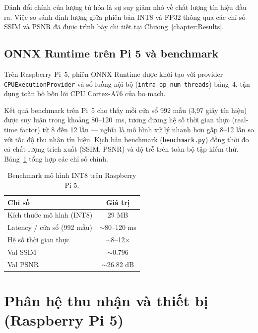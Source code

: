 \documentclass[../DoAn.tex]{subfiles}
\begin{document}
Đánh đổi chính của lượng tử hóa là sự suy giảm nhỏ về chất lượng tín hiệu đầu ra. Việc so sánh định lượng giữa phiên bản INT8 và FP32 thông qua các chỉ số SSIM và PSNR đã được trình bày chi tiết tại Chương~\ref{chapter:Results}.

\subsection{ONNX Runtime trên Pi 5 và benchmark}

Trên Raspberry Pi~5, phiên ONNX Runtime được khởi tạo với provider \texttt{CPUExecutionProvider} và số luồng nội bộ (\texttt{intra\_op\_num\_threads}) bằng~4, tận dụng toàn bộ bốn lõi CPU Cortex-A76 của bo mạch.

Kết quả benchmark trên Pi~5 cho thấy mỗi cửa sổ 992 mẫu (3{,}97 giây tín hiệu) được suy luận trong khoảng 80--120~ms, tương đương hệ số thời gian thực (real-time factor) từ 8 đến 12 lần --- nghĩa là mô hình xử lý nhanh hơn gấp 8--12 lần so với tốc độ thu nhận tín hiệu. Kịch bản benchmark (\texttt{benchmark.py}) đồng thời đo cả chất lượng trích xuất (SSIM, PSNR) và độ trễ trên toàn bộ tập kiểm thử. Bảng~\ref{tab:benchmark_int8} tổng hợp các chỉ số chính.

\begin{table}[htbp]
  \centering
  \caption{Benchmark mô hình INT8 trên Raspberry Pi 5.}
  \label{tab:benchmark_int8}
  \begin{tabular}{|l|c|}
    \hline
    \textbf{Chỉ số} & \textbf{Giá trị} \\\hline
    Kích thước mô hình (INT8) & 29 MB \\\hline
    Latency / cửa sổ (992 mẫu) & $\sim$80--120 ms \\\hline
    Hệ số thời gian thực & $\sim$8--12$\times$ \\\hline
    Val SSIM & $\sim$0.796 \\\hline
    Val PSNR & $\sim$26.82 dB \\\hline
  \end{tabular}
\end{table}

\section{Phân hệ thu nhận và thiết bị (Raspberry Pi 5)}
\end{document}
